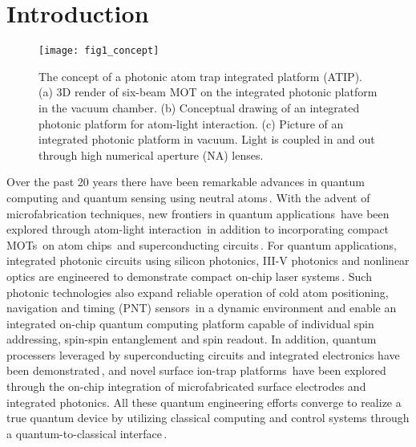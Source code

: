\documentclass{osa-article}
\begin{document}
\section{Introduction}


\begin{figure}[b!]
\centering\texttt{[image: fig1\_concept]}
\caption{The concept of a photonic atom trap integrated platform (ATIP). (a) 3D render of six-beam MOT on the integrated photonic platform in the vacuum chamber. (b) Conceptual drawing of an integrated photonic platform for atom-light interaction. (c) Picture of an integrated photonic platform in vacuum. Light is coupled in and out through high numerical aperture (NA) lenses.}
\label{fig_1}
\end{figure}

Over the past 20 years there have been remarkable advances in quantum computing and quantum sensing using neutral atoms\,\cite{Weiss17, Alzar19}. With the advent of microfabrication techniques, new frontiers in quantum applications\,\cite{DiVincenzo00, Zoller01, Qi18} have been explored  through atom-light interaction\,\cite{Mabuchi06, Stern13, Rolston13a, Lukin14, Kimble15, Rolston15, Stievater16, Black18, Pfau18, Hung19, Hackermueller20, Kimble20, Ayi-Yovo20} in addition to incorporating compact MOTs\,\cite{Takuma91, Jhe96, Hinds09, Arnold10, Hinds13, Lee13, Bongs16, Squires17, Arnold17} on atom chips\,\cite{Hansch99, Schmiedmayer00, Folman05, Anderson05, Reichel07, Anderson13,Himsworth14, Folman16} and superconducting circuits\,\cite{Schmiedmayer09, Rolston11, Rolston13b, Schmiedmayer15, Park15, Fortagh17}. For quantum applications, integrated photonic circuits using silicon photonics, III-V photonics and nonlinear optics are engineered to demonstrate compact on-chip laser systems\,\cite{Kodigala19, Zwiller20, Hazan20}. Such photonic technologies also expand reliable operation of cold atom positioning, navigation and timing (PNT) sensors\,\cite{Biedermann14} in a dynamic environment and enable an integrated on-chip quantum computing platform capable of individual spin addressing, spin-spin entanglement and spin readout. In addition, quantum processers leveraged by superconducting circuits and integrated electronics have been demonstrated\,\cite{Knight17, Martinis19}, and novel surface ion-trap platforms\,\cite{Zhang17, Chiaverini20} have been explored through the on-chip integration of microfabricated surface electrodes and integrated photonics. All these quantum engineering efforts converge to realize a true quantum device by utilizing classical computing and control systems through a quantum-to-classical interface\,\cite{Reilly15}.
\end{document}
